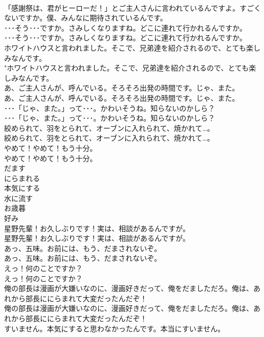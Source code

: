 \documentclass[8pt]{extreport}
\begin{document}
\begin{CJK}{UTF8}{min}
\\	「感謝祭は、君がヒーローだ！」とご主人さんに言われているんですよ。すごくないですか。僕、みんなに期待されているんです。 
\\	･･･そう･･･ですか。さみしくなりますね。どこに連れて行かれるんですか。	
\\	･･･そう･･･ですか。さみしくなりますね。どこに連れて行かれるんですか。 
\\	ホワイトハウスと言われました。そこで、兄弟達を紹介されるので、とても楽しみなんです。	
\\	"ホワイトハウスと言われました。そこで、兄弟達を紹介されるので、とても楽しみなんです。 
\\	あ、ご主人さんが、呼んでいる。そろそろ出発の時間です。じゃ、また。	
\\	あ、ご主人さんが、呼んでいる。そろそろ出発の時間です。じゃ、また。 
\\	･･･「じゃ、また。」って･･･。かわいそうね。知らないのかしら？	
\\	･･･「じゃ、また。」って･･･。かわいそうね。知らないのかしら？ 
\\	絞められて、羽をとられて、オーブンに入れられて、焼かれて…。	
\\	絞められて、羽をとられて、オーブンに入れられて、焼かれて…。 
\\	やめて！やめて！もう十分。	
\\	やめて！やめて！もう十分。 
\\	だます
\\	にらまれる
\\	本気にする
\\	水に流す
\\	お歳暮
\\	好み
\\	星野先輩！お久しぶりです！実は、相談があるんですが。	
\\	星野先輩！お久しぶりです！実は、相談があるんですが。 
\\	あっ、五味。お前には、もう、だまされないぞ。	
\\	あっ、五味。お前には、もう、だまされないぞ。 
\\	えっ！何のことですか？	
\\	えっ！何のことですか？ 
\\	俺の部長は漫画が大嫌いなのに、漫画好きだって、俺をだましただろ。俺は、あれから部長ににらまれて大変だったんだぞ！	
\\	俺の部長は漫画が大嫌いなのに、漫画好きだって、俺をだましただろ。俺は、あれから部長ににらまれて大変だったんだぞ！ 
\\	すいません。本気にすると思わなかったんです。本当にすいません。	

\end{CJK}
\end{document}
